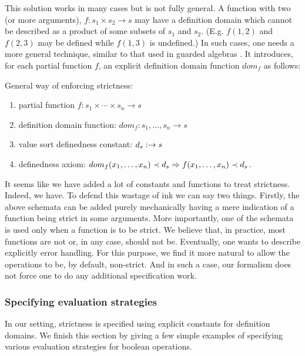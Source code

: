 \documentclass[10pt]{article}
\begin{document}
This solution works in many cases but is not fully general. A function with
two (or more arguments), $f:s_1\times s_2\to s$ may have a definition domain
which cannot be described as a product of some subsets of $s_1$ and
$s_2$. (E.g. $f(1,2)$ and $f(2,3)$ may be defined while $f(1,3)$ is
undefined.)
In such cases, one needs a more general technique, similar to that
used in  guarded algebras \cite{guard}. It introduces, for each partial
function $f$, an explicit definition domain function $dom_f$ as follows:
%
\begin{schem}\label{sch:strict}
General way of enforcing strictness:
\begin{enumerate}\MyLPar
	\item partial function $f: s_1 \times \cdots \times s_n \to s$ 
	\item definition domain function: ${dom}_f:s_1, \ldots , s_n \to s$ 
	\item value sort definedness constant: $d_{s}: \to s$ 
	\item definedness axiom: $dom_f(x_1, \ldots ,x_n) \prec d_{s} \Rightarrow
	f(x_1, \ldots ,x_n) \prec d_{s}$.	
\end{enumerate}
\end{schem}
%
It seems like we have added a lot of constants and functions to treat strictness. Indeed,
we have. To defend this wastage of ink we can say two things. Firstly, 
the above schemata can be added purely mechanically having a mere indication of
a function being strict in some arguments. More importantly, one of the schemata is
used only when a function is to be strict. We believe that, in practice, most
functions are not or, in any case, should not be. Eventually, one wants to
describe explicitly error handling. For this purpose, we find it more natural
to allow the operations to be, by default, non-strict. And in such a case, our formalism
does not force one to do any additional specification work.

\subsubsection{Specifying evaluation strategies}\label{sub:eva}
In our setting, strictness is specified using explicit constants for
definition domains. We finish this section by giving a few simple examples of
specifying various evaluation strategies for boolean operations.
\end{document}
